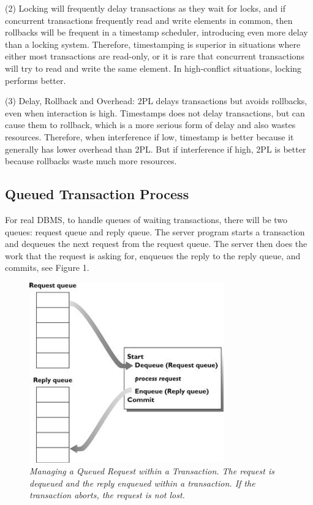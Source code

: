 \documentclass{article}
\begin{document}
\noindent (2) Locking will frequently delay transactions as they wait for locks, and if concurrent transactions frequently read and write elements in common, then rollbacks will be frequent in a timestamp scheduler, introducing even more delay than a locking system. Therefore, timestamping is superior in situations where either most transactions are read-only, or it is rare that concurrent transactions will try to read and write the same element. In high-conflict situations, locking performs better.

\noindent (3) Delay, Rollback and Overhead: 2PL delays transactions but avoids rollbacks, even when interaction is high. Timestamps does not delay transactions, but can cause them to rollback, which is a more serious form of delay and also wastes resources. Therefore, when interference if low, timestamp is better because it generally has lower overhead than 2PL. But if interference if high, 2PL is better because rollbacks waste much more resources.

\goodbreak

\subsection{Queued Transaction Process}

For real DBMS, to handle queues of waiting transactions, there will be two queues: request queue and reply queue. The server program starts a transaction and dequeues the next request from the request queue. The server then does the work that the request is asking for, enqueues the reply to the reply queue, and commits, see Figure 1.

\begin{figure}[htp]
\centering
\includegraphics[width=8.4cm]{queued_TP.jpg}
\caption{\textit{Managing a Queued Request within a Transaction. The request is dequeued and the reply enqueued within a transaction. If the transaction aborts, the request is not lost.}}
\end{figure}
\end{document}
